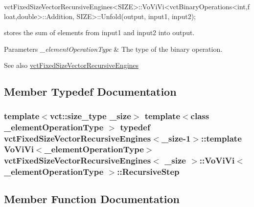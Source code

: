 \begin{DoxyPre}vctFixedSizeVectorRecursiveEngines<SIZE>::VoViVi<vctBinaryOperations<int,float,double>::Addition, SIZE>::Unfold(output, input1, input2);
\end{DoxyPre}
 stores the sum of elements from input1 and input2 into output.


\begin{DoxyParams}{Parameters}
{\em \+\_\+element\+Operation\+Type} & The type of the binary operation.\\
\hline
\end{DoxyParams}
\begin{DoxySeeAlso}{See also}
\hyperlink{classvct_fixed_size_vector_recursive_engines}{vct\+Fixed\+Size\+Vector\+Recursive\+Engines} 
\end{DoxySeeAlso}


\subsection{Member Typedef Documentation}
\hypertarget{classvct_fixed_size_vector_recursive_engines_1_1_vo_vi_vi_ab2721312ef2322e61092499ea592bef5}{}
\subsubsection[{Recursive\+Step}]{\setlength{\rightskip}{0pt plus 5cm}template$<$vct\+::size\+\_\+type \+\_\+size$>$ template$<$class \+\_\+element\+Operation\+Type $>$ typedef {\bf vct\+Fixed\+Size\+Vector\+Recursive\+Engines}$<$\+\_\+size-\/1$>$\+::template {\bf Vo\+Vi\+Vi}$<$\+\_\+element\+Operation\+Type$>$ {\bf vct\+Fixed\+Size\+Vector\+Recursive\+Engines}$<$ \+\_\+size $>$\+::{\bf Vo\+Vi\+Vi}$<$ \+\_\+element\+Operation\+Type $>$\+::{\bf Recursive\+Step}}\label{classvct_fixed_size_vector_recursive_engines_1_1_vo_vi_vi_ab2721312ef2322e61092499ea592bef5}


\subsection{Member Function Documentation}
\hypertarget{classvct_fixed_size_vector_recursive_engines_1_1_vo_vi_vi_a0085c6d9a5fba75ef6922a41f5fc8e81}{}
